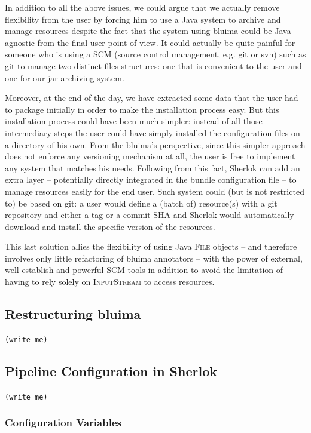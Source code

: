 \documentclass{article}
\newcommand{\id}[1]{\mbox{\textsc{#1}}}
\newcommand{\TODO}[1]{\texttt{\textcolor{YellowOrange}{(#1)}}} %
\begin{document}
In addition to all the above issues, we could argue that we actually remove flexibility from the user by forcing him to use a Java system to archive and manage resources despite the fact that the system using bluima could be Java agnostic from the final user point of view. It could actually be quite painful for someone who is using a SCM (source control management, e.g. git or svn) such as git to manage two distinct files structures: one that is convenient to the user and one for our jar archiving system.

Moreover, at the end of the day, we have extracted some data that the user had to package initially in order to make the installation process easy. But this installation process could have been much simpler: instead of all those intermediary steps the user could have simply installed the configuration files on a directory of his own. From the bluima's perspective, since this simpler approach does not enforce any versioning mechanism at all, the user is free to implement any system that matches his needs. Following from this fact, Sherlok can add an extra layer -- potentially directly integrated in the bundle configuration file -- to manage resources easily for the end user. Such system could (but is not restricted to) be based on git: a user would define a (batch of) resource(s) with a git repository and either a tag or a commit SHA and Sherlok would automatically download and install the specific version of the resources.

This last solution allies the flexibility of using Java \id{File} objects -- and therefore involves only little refactoring of bluima annotators -- with the power of external, well-establish and powerful SCM tools in addition to avoid the limitation of having to rely solely on \id{InputStream} to access resources.

\subsection{Restructuring bluima}

\TODO{write me}

\subsection{Pipeline Configuration in Sherlok}

\TODO{write me}

\subsubsection{Configuration Variables}
\end{document}

